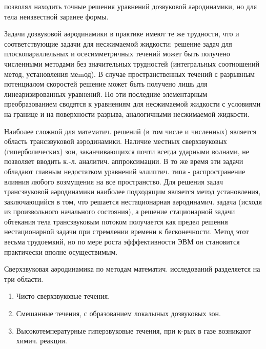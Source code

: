 \documentclass[10pt]{article}
\begin{document}
позволял находить точные решения уравнений дозвуковой аәродинамики, но для тела неизвестной заранее формы.



Задачи дозвуковой аәродинамики в практике имеют те же трудности, что и соответствующие задачи для несжимаемой жидкости: решение задач для плоскопараллельных и осесимметричных течений может быть получено численными методами без значительных трудностей (интегральных соотношений метод, установления меmод). В случае пространственных течений с разрывным потенциалом скоростей решение может быть получено лишь для линеаризированных уравнений. Но эти последние элементарным преобразованием сводятся к уравнениям для несжимаемой жидкости с условиями на границе и на поверхности разрыва, аналогичными несжимаемой жидкости.



Наиболее сложной для математич. решений (в том числе и численных) является область трансзвуковой аэродинамики. Наличие местных сверхзвуковых (гиперболических) зон, заканчивающихся почти всегда ударными волнами, не позволяет вводить к.-л. аналитич. аппроксимации. В то же время эти задачи обладают главным недостатком уравнений эллиптич. типа - распространение влияния любого возмущения на все пространство. Для решения задач трансзвуковой аәродинамики наиболее подходящим является метод установления, заключающийся в том, что решается нестационарная аәродинамич. задача (исходя из произвольного начального состояния), а решение стационарной задачи обтекания тела трансзвуковым потоком получается как предел решения нестационарной задачи при стремлении времени к бесконечности. Метод этот весьма трудоемкий, но по мере роста эфффективности ЭВМ он становится практически вполне осуществимым.



Сверхзвуковая аәродинамика по методам математич. исследований разделяется на три области.



\begin{enumerate}

  \item Чисто сверхзвуковые течения.



  \item Смешанные течения, с образованием локалыных дозвуковых зон.



  \item Высокотемпературные гиперзвуковые течения, при к-рых в газе возникают химич. реакции.



\end{enumerate}
\end{document}
